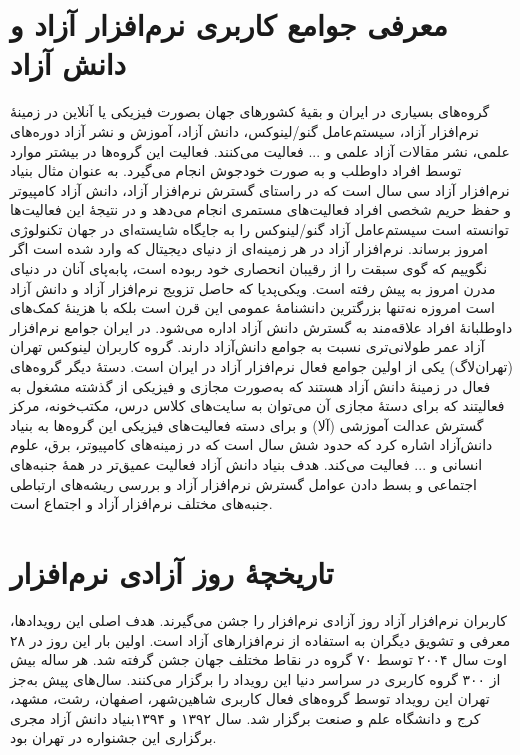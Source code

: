 \documentclass{article}
\begin{document}
\section{معرفی جوامع کاربری نرم‌افزار آزاد و دانش آزاد}
گروه‌های بسیاری در ایران و بقیهٔ کشورهای جهان بصورت فیزیکی یا آنلاین در زمینهٔ نرم‌افزار آزاد، سیستم‌عامل‌ گنو/لینوکس، دانش آزاد، آموزش و نشر آزاد دوره‌های علمی، نشر مقالات آزاد علمی و ... فعالیت می‌کنند. فعالیت این گروه‌ها در بیشتر موارد توسط افراد داوطلب و به صورت خودجوش انجام می‌گیرد.
به عنوان مثال بنیاد نرم‌افزار آزاد سی سال است که در راستای گسترش نرم‌افزار آزاد، دانش آزاد کامپیوتر و حفظ حریم شخصی افراد فعالیت‌های مستمری انجام می‌دهد و در نتیجهٔ این فعالیت‌ها توانسته است سیستم‌عامل آزاد گنو/لینوکس را به جایگاه شایسته‌ای در جهان تکنولوژی امروز برساند. نرم‌افزار آزاد در هر زمینه‌ای از دنیای دیجیتال که وارد شده است اگر نگوییم که گوی سبقت را از رقیبان انحصاری خود ربوده است، پابه‌پای آنان در دنیای مدرن امروز به پیش رفته است.
ویکی‌پدیا که حاصل تزویج نرم‌افزار آزاد و دانش آزاد است امروزه نه‌تنها بزرگترین دانشنامهٔ عمومی این قرن است بلکه با هزینهٔ کمک‌های داوطلبانهٔ افراد علاقه‌مند به گسترش دانش آزاد اداره می‌شود. در ایران جوامع نرم‌افزار آزاد عمر طولانی‌تری نسبت به جوامع دانش‌آزاد دارند. گروه کاربران لینوکس تهران (تهران‌لاگ) یکی از اولین جوامع فعال نرم‌افزار آزاد در ایران است. دستهٔ دیگر گروه‌های فعال در زمینهٔ دانش آزاد هستند که به‌صورت مجازی و فیزیکی از گذشته مشغول به فعالیتند که برای دستهٔ مجازی آن می‌توان به سایت‌های کلاس درس، مکتب‌خونه،‌ مرکز گسترش عدالت آموزشی (آلا) و برای دسته فعالیت‌های فیزیکی این گروه‌ها به بنیاد دانش‌آزاد اشاره کرد که حدود شش سال است که در زمینه‌های کامپیوتر، برق، علوم انسانی و ... فعالیت می‌کند. هدف بنیاد دانش آزاد فعالیت عمیق‌تر در همهٔ جنبه‌‌های اجتماعی و بسط دادن عوامل گسترش نرم‌افزار آزاد و بررسی ریشه‌‌های ارتباطی جنبه‌های مختلف نرم‌افزار آزاد و اجتماع است.

\section{تاریخچهٔ روز آزادی نرم‌افزار}
کاربران نرم‌افزار آزاد روز آزادی نرم‌افزار را جشن می‌گیرند. هدف اصلی این رویدادها، معرفی و تشویق دیگران به استفاده از نرم‌افزارهای آزاد است.
اولین بار این روز در ۲۸ اوت سال ۲۰۰۴ توسط ۷۰ گروه در نقاط مختلف جهان جشن گرفته شد. هر ساله بیش از ۳۰۰ گروه کاربری در سراسر دنیا این رویداد را برگزار می‌کنند. سال‌های پیش به‌جز تهران این رویداد توسط گروه‌های فعال کاربری شاهین‌شهر، اصفهان، رشت، مشهد، کرج و دانشگاه علم و صنعت برگزار شد. سال ۱۳۹۲ و ۱۳۹۴بنیاد دانش آزاد مجری برگزاری این جشنواره در تهران بود.
\end{document}
